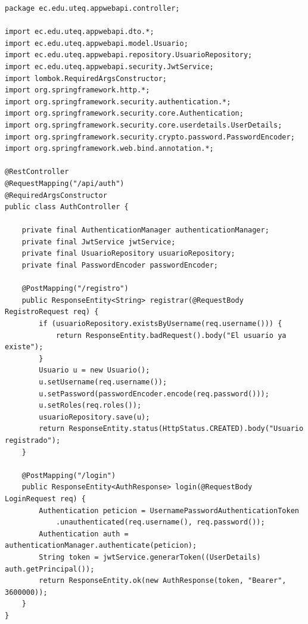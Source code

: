 \documentclass[11pt]{article}
\begin{document}
\begin{cajacodigo}
\begin{lstlisting}[style=java]
package ec.edu.uteq.appwebapi.controller;

import ec.edu.uteq.appwebapi.dto.*;
import ec.edu.uteq.appwebapi.model.Usuario;
import ec.edu.uteq.appwebapi.repository.UsuarioRepository;
import ec.edu.uteq.appwebapi.security.JwtService;
import lombok.RequiredArgsConstructor;
import org.springframework.http.*;
import org.springframework.security.authentication.*;
import org.springframework.security.core.Authentication;
import org.springframework.security.core.userdetails.UserDetails;
import org.springframework.security.crypto.password.PasswordEncoder;
import org.springframework.web.bind.annotation.*;

@RestController
@RequestMapping("/api/auth")
@RequiredArgsConstructor
public class AuthController {

    private final AuthenticationManager authenticationManager;
    private final JwtService jwtService;
    private final UsuarioRepository usuarioRepository;
    private final PasswordEncoder passwordEncoder;

    @PostMapping("/registro")
    public ResponseEntity<String> registrar(@RequestBody RegistroRequest req) {
        if (usuarioRepository.existsByUsername(req.username())) {
            return ResponseEntity.badRequest().body("El usuario ya existe");
        }
        Usuario u = new Usuario();
        u.setUsername(req.username());
        u.setPassword(passwordEncoder.encode(req.password()));
        u.setRoles(req.roles());
        usuarioRepository.save(u);
        return ResponseEntity.status(HttpStatus.CREATED).body("Usuario registrado");
    }

    @PostMapping("/login")
    public ResponseEntity<AuthResponse> login(@RequestBody LoginRequest req) {
        Authentication peticion = UsernamePasswordAuthenticationToken
            .unauthenticated(req.username(), req.password());
        Authentication auth = authenticationManager.authenticate(peticion);
        String token = jwtService.generarToken((UserDetails) auth.getPrincipal());
        return ResponseEntity.ok(new AuthResponse(token, "Bearer", 3600000));
    }
}
\end{lstlisting}
\end{cajacodigo}
\end{document}
